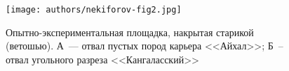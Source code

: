 \begin{figure}
  \begin{center}
    \texttt{[image: authors/nekiforov-fig2.jpg]}
  \end{center}
  \caption{Опытно-экспериментальная площадка, накрытая старикой (ветошью).
  А~--- отвал пустых пород карьера <<Айхал>>; Б~-- отвал угольного разреза <<Кангаласский>>}
  \label{fig:nekiforov-fig2}
\end{figure}
